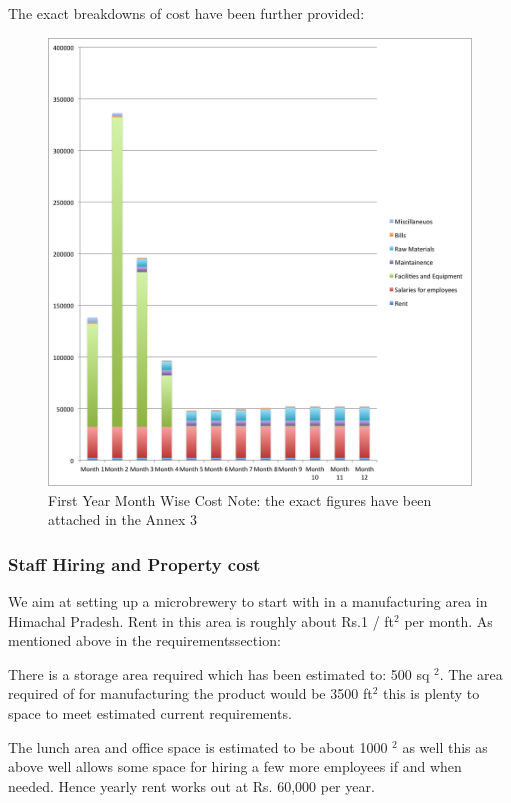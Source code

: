\documentclass[11pt]{article}
\begin{document}
The exact breakdowns of cost have been further provided:

	\begin{figure}[H]
	\caption{First Year Month Wise Cost \newline Note: the exact figures have been
attached in the Annex 3}
	\centering
	\includegraphics[width=\textwidth]{month_wise_cost.png}
	\end{figure}

      \subsubsection{Staff Hiring and Property cost}
We aim at setting up a microbrewery to start with in a manufacturing area in
Himachal Pradesh. Rent in this area is roughly about Rs.1 / ft$^2$ per month. As
mentioned above in the requirementssection:

There is a storage area required which has been estimated to: 500 sq $^2$.
The area required of for manufacturing the product would be 3500 ft$^2$ this
is plenty to space to meet estimated current requirements.

The lunch area and office space is estimated to be about 1000 $^2$ as well this
as above well allows some space for hiring a few more employees if and when
needed. Hence yearly rent works out at Rs. 60,000 per year.
\end{document}
